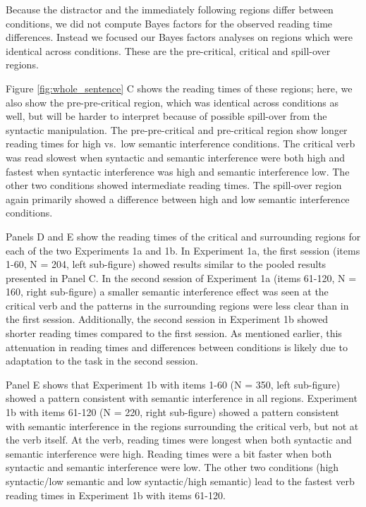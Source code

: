 \documentclass[a4paper, man, floatsintext]{apa7}
\begin{document}
Because the distractor and the immediately following regions differ between conditions, we did not compute Bayes factors for the observed reading time differences. Instead we focused our Bayes factors analyses on regions which were identical across conditions. These are the pre-critical, critical and spill-over regions.


Figure \ref{fig:whole_sentence} C shows the reading times of these regions; here, we also show the pre-pre-critical region, which was identical across conditions as well, but will be harder to interpret because of possible spill-over from the syntactic manipulation. The pre-pre-critical and pre-critical region show longer reading times for high vs.\ low semantic interference conditions. The critical verb was read slowest when syntactic and semantic interference were both high and fastest when syntactic interference was high and semantic interference low. The other two conditions showed intermediate reading times. The spill-over region again primarily showed a difference between high and low semantic interference conditions. 

Panels D and E show the reading times of the critical and surrounding regions for each of the two Experiments 1a and 1b. In Experiment 1a, the first session (items 1-60, N = 204, left sub-figure) showed results similar to the pooled results presented in Panel C. In the second session of Experiment 1a (items 61-120, N = 160, right sub-figure) a smaller semantic interference effect was seen at the critical verb and the patterns in the surrounding regions were less clear than in the first session. Additionally, the second session in Experiment 1b showed shorter reading times compared to the first session. As mentioned earlier, this attenuation in reading times and differences between conditions is likely due to  adaptation to the task in the second session. 

Panel E shows that Experiment 1b with items 1-60 (N = 350, left sub-figure) showed a pattern consistent with semantic interference in all regions. Experiment 1b with items 61-120 (N = 220, right sub-figure) showed a pattern consistent with semantic interference in the regions surrounding the critical verb, but not at the verb itself. At the verb, reading times were longest when both syntactic and semantic interference were high. Reading times were a bit faster when both syntactic and semantic interference were low. The other two conditions (high syntactic/low semantic and low syntactic/high semantic) lead to the fastest verb reading times in Experiment 1b with items 61-120. 
\end{document}
